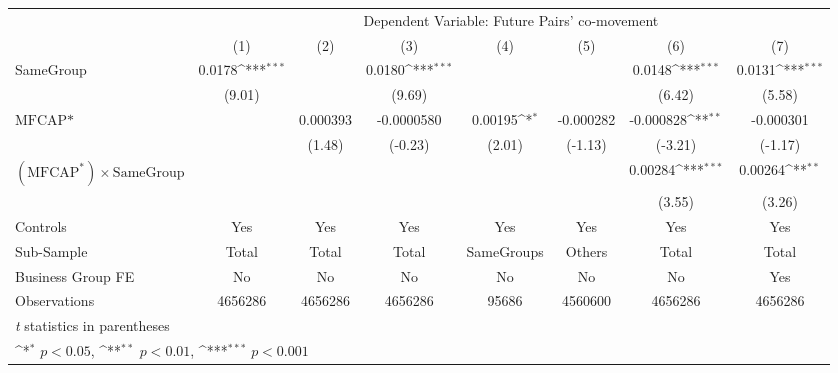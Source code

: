 {
\def\sym#1{\ifmmode^{#1}\else\(^{#1}\)\fi}
\begin{tabular}{l*{7}{c}}
\hline\hline
                &\multicolumn{7}{c}{Dependent Variable: Future Pairs' co-movement}                                                                   \\\cmidrule(lr){2-8}
                &\multicolumn{1}{c}{(1)}         &\multicolumn{1}{c}{(2)}         &\multicolumn{1}{c}{(3)}         &\multicolumn{1}{c}{(4)}         &\multicolumn{1}{c}{(5)}         &\multicolumn{1}{c}{(6)}         &\multicolumn{1}{c}{(7)}         \\
\hline
SameGroup       &   0.0178\sym{***}&                  &   0.0180\sym{***}&                  &                  &   0.0148\sym{***}&   0.0131\sym{***}\\
                &   (9.01)         &                  &   (9.69)         &                  &                  &   (6.42)         &   (5.58)         \\
[1em]
$ \text{MFCAP*} $&                  & 0.000393         &-0.0000580         &  0.00195\sym{*}  &-0.000282         &-0.000828\sym{**} &-0.000301         \\
                &                  &   (1.48)         &  (-0.23)         &   (2.01)         &  (-1.13)         &  (-3.21)         &  (-1.17)         \\
[1em]
 $ (\text{MFCAP}^*) \times {\text{SameGroup} }  $ &                  &                  &                  &                  &                  &  0.00284\sym{***}&  0.00264\sym{**} \\
                &                  &                  &                  &                  &                  &   (3.55)         &   (3.26)         \\
\hline
Controls        &      Yes         &      Yes         &      Yes         &      Yes         &      Yes         &      Yes         &      Yes         \\
Sub-Sample      &    Total         &    Total         &    Total         &SameGroups         &   Others         &    Total         &    Total         \\
Business Group FE&       No         &       No         &       No         &       No         &       No         &       No         &      Yes         \\
Observations    &  4656286         &  4656286         &  4656286         &    95686         &  4560600         &  4656286         &  4656286         \\
\hline\hline
\multicolumn{8}{l}{\footnotesize \textit{t} statistics in parentheses}\\
\multicolumn{8}{l}{\footnotesize \sym{*} \(p<0.05\), \sym{**} \(p<0.01\), \sym{***} \(p<0.001\)}\\
\end{tabular}
}
